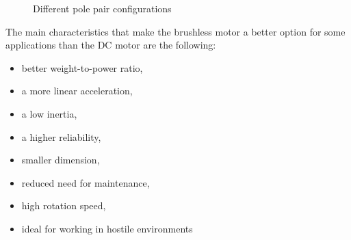 \begin{figure}[htbp]
	\centering
    \hfill
    \hfill
    \caption{Different pole pair configurations}
    \label{fig:pole_pairs}
\end{figure}

The main characteristics that make the brushless motor a better option for some applications than the \ac{DC} motor are the following:
\begin{itemize}
	\item better weight-to-power ratio,
	\item a more linear acceleration,
	\item a low inertia,
	\item a higher reliability,
	\item smaller dimension,
	\item reduced need for maintenance,
	\item high rotation speed,
	\item ideal for working in hostile environments
\end{itemize}

